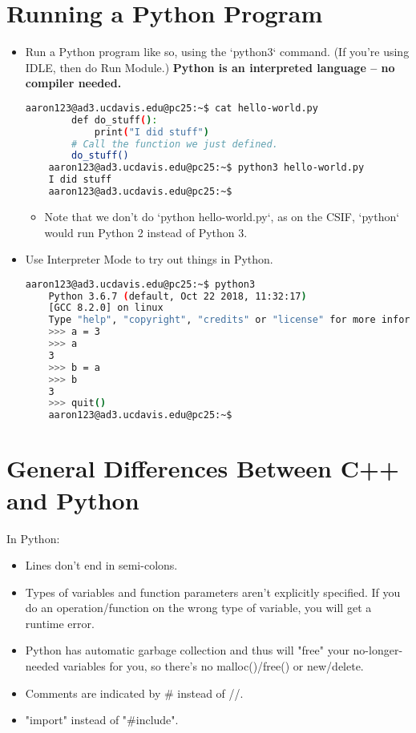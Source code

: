 \documentclass{article}
\begin{document}
\section{Running a Python Program}
\begin{itemize}
    \item Run a Python program like so, using the `python3` command. (If you're using IDLE, then do Run Module.) \textbf{Python is an interpreted language -- no compiler needed.}
    \begin{lstlisting}[language=bash]
    aaron123@ad3.ucdavis.edu@pc25:~$ cat hello-world.py 
        def do_stuff():
            print("I did stuff")
        # Call the function we just defined.
        do_stuff()
    aaron123@ad3.ucdavis.edu@pc25:~$ python3 hello-world.py 
    I did stuff
    aaron123@ad3.ucdavis.edu@pc25:~$ 
    \end{lstlisting}
    \begin{itemize}
        \item Note that we don't do `python hello-world.py`, as on the CSIF, `python` would run Python 2 instead of Python 3.
    \end{itemize}
    \item Use Interpreter Mode to try out things in Python.
    \begin{lstlisting}[language=bash]
    aaron123@ad3.ucdavis.edu@pc25:~$ python3
    Python 3.6.7 (default, Oct 22 2018, 11:32:17) 
    [GCC 8.2.0] on linux
    Type "help", "copyright", "credits" or "license" for more information.
    >>> a = 3
    >>> a
    3
    >>> b = a
    >>> b
    3
    >>> quit()
    aaron123@ad3.ucdavis.edu@pc25:~$ 
    \end{lstlisting}
\end{itemize}

\section{General Differences Between C++ and Python}
\label{sec:general-differences}
In Python:
\begin{itemize}
    \item Lines don't end in semi-colons.
    \item Types of variables and function parameters aren't explicitly specified. If you do an operation/function on the wrong type of variable, you will get a runtime error.
    \item Python has automatic garbage collection and thus will "free" your no-longer-needed variables for you, so there's no malloc()/free() or new/delete.
    \item Comments are indicated by \# instead of //.
    \item "import" instead of "\#include".
\end{itemize}
\end{document}
